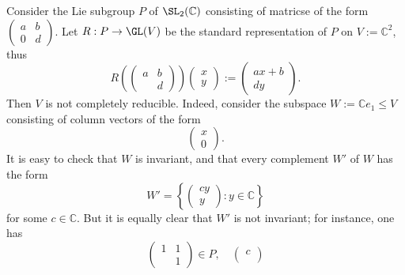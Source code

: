 \documentclass[reqno]{amsart} 
\begin{document}
\begin{example}\label{example:defining-representation-of-borel-is-not-completely-reducible}
  Consider the Lie subgroup $P$ of $\SL_2(\mathbb{C})$
  consisting of matricse of the form
  $
\begin{pmatrix}
    a & b \\
    0 & d
  \end{pmatrix}
$.
  Let $R : P \rightarrow \GL(V)$ be the standard representation
  of $P$ on $V := \mathbb{C}^2$,
  thus
  \begin{equation*}
    R(
\begin{pmatrix}
      a & b \\
      & d
    \end{pmatrix}
)
    \begin{pmatrix}
      x  \\
      y        
    \end{pmatrix}
    :=
    \begin{pmatrix}
      a x + b  \\
      d y        
    \end{pmatrix}
.
  \end{equation*}
  Then
  $V$ is not completely reducible.
  Indeed, consider the subspace
  $W := \mathbb{C} e_1 \leq V$
  consisting of column vectors of the form
  \begin{equation*}
    \begin{pmatrix}
      x  \\
      0
    \end{pmatrix}
.
  \end{equation*}
  It is easy to check that $W$ is invariant,
  and that every complement $W'$ of $W$ has the form
  \begin{equation*}
    W' = \left\{ 
\begin{pmatrix}
        c y  \\
        y
      \end{pmatrix}
 : y \in \mathbb{C}  \right\}
  \end{equation*}
  for some $c \in \mathbb{C}$.
  But it is equally clear that $W'$ is not invariant;
  for instance, one has
  \begin{equation*}
    \begin{pmatrix}
      1 & 1 \\
       & 1
     \end{pmatrix}
 \in P,
     \quad 
    \begin{pmatrix}
      c  \\

\end{pmatrix}
\end{equation*}
\end{example}
\end{document}
